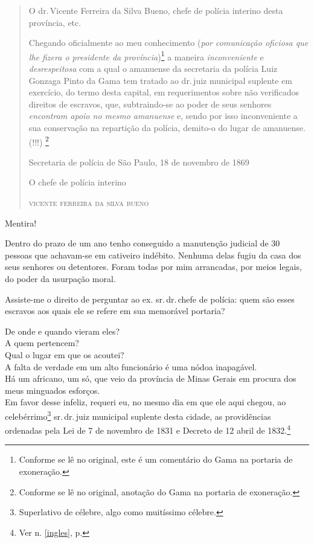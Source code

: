\begin{quote}
O dr.\,Vicente Ferreira da Silva Bueno, chefe de polícia interino desta
província, etc.

Chegando oficialmente ao meu conhecimento (\emph{por comunicação
oficiosa que lhe fizera o presidente da província})\footnote{Conforme
  se lê no original, este é um comentário do Gama na portaria de
  exoneração.} a maneira \emph{inconveniente} e \emph{desrespeitosa} com
a qual o amanuense da secretaria da polícia Luiz Gonzaga Pinto da Gama
tem tratado ao dr.\,juiz municipal suplente em exercício, do termo desta
capital, em requerimentos sobre não verificados direitos de escravos,
que, subtraindo-se ao poder de seus senhores \emph{encontram apoio no
mesmo amanuense} e, sendo por isso inconveniente a sua conservação na
repartição da polícia, demito-o do lugar de amanuense. (!!!) \footnote{
  Conforme se lê no original, anotação do Gama na portaria de
  exoneração.}

\begin{flushright}
Secretaria de polícia de São Paulo, 18 de novembro de 1869

O chefe de polícia interino

\textsc{vicente ferreira da silva bueno}
\end{flushright}
\end{quote}

Mentira!

Dentro do prazo de um ano tenho conseguido a manutenção judicial de 30
pessoas que achavam-se em cativeiro indébito. Nenhuma delas fugiu da
casa dos seus senhores ou detentores. Foram todas por mim arrancadas,
por meios legais, do poder da usurpação moral.

Assiste-me o direito de perguntar ao ex. sr.\,dr.\,chefe de polícia: quem
são esses escravos aos quais ele se refere em sua memorável portaria?

De onde e quando vieram eles?\\
A quem pertencem?\\
Qual o lugar em que os acoutei?\\
A falta de verdade em um alto funcionário é uma nódoa inapagável.\\
Há um africano, um só, que veio da província de Minas Gerais em procura
dos meus minguados esforços.\\
Em favor desse infeliz, requeri eu, no mesmo dia em que ele aqui chegou,
ao celebérrimo\footnote{Superlativo de célebre, algo como muitíssimo
  célebre.} sr.\,dr.\,juiz municipal suplente desta cidade, as
providências ordenadas pela Lei de 7 de novembro de 1831 e Decreto de 12
abril de 1832.\footnote{Ver n. \ref{ingles}, p. \pageref{ingles}}

